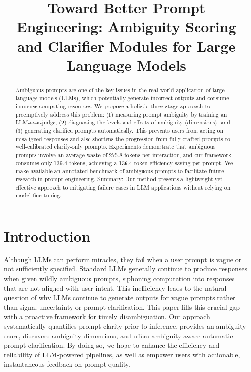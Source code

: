 \documentclass[11pt,a4paper]{article}
\begin{document}
%
\title{Toward Better Prompt Engineering: Ambiguity Scoring and Clarifier Modules for Large Language Models}

\date{}



\maketitle

\begin{abstract}
Ambiguous prompts are one of the key issues in the real-world application of large language models (LLMs), which potentially generate incorrect outputs and consume immense computing resources. We propose a holistic three-stage approach to preemptively address this problem: (1) measuring prompt ambiguity by training an LLM-as-a-judge, (2) diagnosing the levels and effects of ambiguity (dimensions), and (3) generating clarified prompts automatically. This prevents users from acting on misaligned responses and also shortens the progression from fully crafted prompts to well-calibrated clarify-only prompts. Experiments demonstrate that ambiguous prompts involve an average waste of 275.8 tokens per interaction, and our framework consumes only 139.4 tokens, achieving a 136.4 token efficiency saving per prompt. We make available an annotated benchmark of ambiguous prompts to facilitate future research in prompt engineering. Summary: Our method presents a lightweight yet effective approach to mitigating failure cases in LLM applications without relying on model fine-tuning.
\end{abstract}

\section{Introduction}
Although LLMs can perform miracles, they fail when a user prompt is vague or not sufficiently specified. Standard LLMs generally continue to produce responses when given wildly ambiguous prompts, siphoning computation into responses that are not aligned with user intent. This inefficiency leads to the natural question of why LLMs continue to generate outputs for vague prompts rather than signal uncertainty or prompt clarification. This paper fills this crucial gap with a proactive framework for timely disambiguation. Our approach systematically quantifies prompt clarity prior to inference, provides an ambiguity score, discovers ambiguity dimensions, and offers ambiguity-aware automatic prompt clarification. By doing so, we hope to enhance the efficiency and reliability of LLM-powered pipelines, as well as empower users with actionable, instantaneous feedback on prompt quality.
\end{document}
